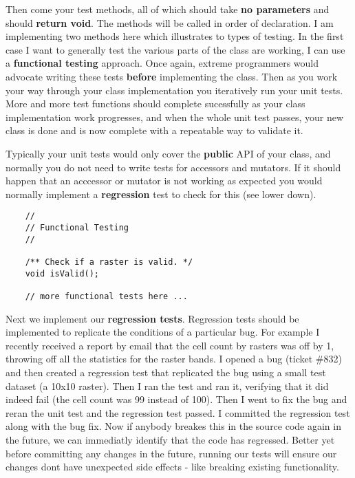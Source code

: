 Then come your test methods, all of which should take \textbf{no parameters} and 
should \textbf{return void}. The methods will be called in order of declaration.
I am implementing two methods here which illustrates to types of testing. In 
the first case I want to generally test the various parts of the class are 
working, I can use a \textbf{functional testing} approach. Once again, extreme 
programmers would advocate writing these tests \textbf{before} implementing the 
class. Then as you work your way through your class implementation you 
iteratively run your unit tests. More and more test functions should complete 
sucessfully as your class implementation work progresses, and when the whole 
unit test passes, your new class is done and is now complete with a repeatable 
way to validate it.

Typically your unit tests would only cover the \textbf{public} API of your 
class, and normally you do not need to write tests for accessors and mutators.
If it should happen that an acccessor or mutator is not working as expected 
you would normally implement a \textbf{regression} test to check for this (see 
lower down).

\begin{verbatim}
    //
    // Functional Testing
    //
    
    /** Check if a raster is valid. */
    void isValid();

    // more functional tests here ...
\end{verbatim}

Next we implement our \textbf{regression tests}. Regression tests should be 
implemented to replicate the conditions of a particular bug. For example 
I recently received a report by email that the cell count by rasters was 
off by 1, throwing off all the statistics for the raster bands. I opened 
a bug (ticket \#832) and then created a regression test that replicated 
the bug using a small test dataset (a 10x10 raster). Then I ran the test 
and ran it, verifying that it did indeed fail (the cell count was 99 
instead of 100). Then I went to fix the bug and reran the unit test and 
the regression test passed. I committed the regression test along with 
the bug fix. Now if anybody breakes this in the source code again in the 
future, we can immediatly identify that the code has regressed. Better 
yet before committing any changes in the future, running our tests will 
ensure our changes dont have unexpected side effects - like breaking 
existing functionality.

